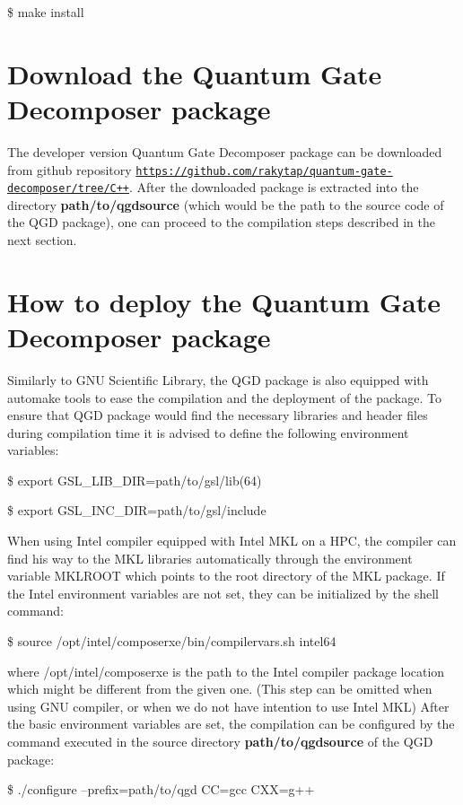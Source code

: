 \$ make install

\section*{Download the Quantum Gate Decomposer package}

The developer version Quantum Gate Decomposer package can be downloaded from github repository \href{https://github.com/rakytap/quantum-gate-decomposer/tree/C++}{\tt https\+://github.\+com/rakytap/quantum-\/gate-\/decomposer/tree/\+C++}. After the downloaded package is extracted into the directory {\bfseries path/to/qgdsource} (which would be the path to the source code of the Q\+GD package), one can proceed to the compilation steps described in the next section.

\section*{How to deploy the Quantum Gate Decomposer package}

Similarly to G\+NU Scientific Library, the Q\+GD package is also equipped with automake tools to ease the compilation and the deployment of the package. To ensure that Q\+GD package would find the necessary libraries and header files during compilation time it is advised to define the following environment variables\+:

\$ export G\+S\+L\+\_\+\+L\+I\+B\+\_\+\+D\+IR=path/to/gsl/lib(64)

\$ export G\+S\+L\+\_\+\+I\+N\+C\+\_\+\+D\+IR=path/to/gsl/include

When using Intel compiler equipped with Intel M\+KL on a H\+PC, the compiler can find his way to the M\+KL libraries automatically through the environment variable M\+K\+L\+R\+O\+OT which points to the root directory of the M\+KL package. If the Intel environment variables are not set, they can be initialized by the shell command\+:

\$ source /opt/intel/composerxe/bin/compilervars.sh intel64

where /opt/intel/composerxe is the path to the Intel compiler package location which might be different from the given one. (This step can be omitted when using G\+NU compiler, or when we do not have intention to use Intel M\+KL) After the basic environment variables are set, the compilation can be configured by the command executed in the source directory {\bfseries path/to/qgdsource} of the Q\+GD package\+:

\$ ./configure --prefix=path/to/qgd CC=gcc C\+XX=g++

